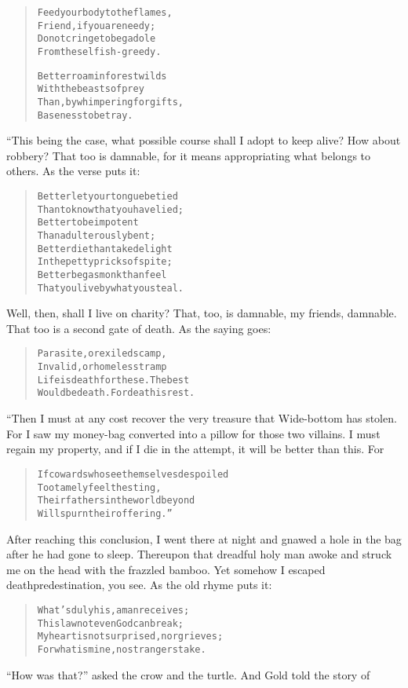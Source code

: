 \documentclass[article, twoside, 14pt]{memoir}
\renewenvironment{verbatim}{%
\begin{quote}%
\vskip -10pt%
\begin{alltt}\normalfont\large}{\end{alltt}%
\end{quote}%
\vskip -10pt
} %
\begin{document}
\begin{verbatim}
Feed your body to the flames,
    Friend, if you are needy;
Do not cringe to beg a dole
    From the selfish-greedy.

Better roam in forest wilds
With the beasts of prey
Than, by whimpering for gifts,
Baseness to betray.
\end{verbatim}
“This being the case, what possible course shall I adopt to keep
alive? How about robbery? That too is damnable, for it means
appropriating what belongs to others. As the verse puts it:

\begin{verbatim}
Better let your tongue be tied
Than to know that you have lied;
Better to be impotent
Than adulterously bent;
Better die than take delight
In the petty pricks of spite;
Better beg as monk than feel
That you live by what you steal.
\end{verbatim}
Well, then, shall I live on charity? That, too, is damnable, my
friends, damnable. That too is a second gate of death. As the
saying goes:

\begin{verbatim}
Parasite, or exiled scamp,
Invalid, or homeless tramp{\textemdash}
Life is death for these. The best
Would be death. For death is rest.
\end{verbatim}
“Then I must at any cost recover the very treasure that Wide-bottom
has stolen. For I saw my money-bag converted into a pillow for
those two villains. I must regain my property, and if I die in the
attempt, it will be better than this. For

\begin{verbatim}
If cowards who see themselves despoiled
    Too tamely feel the sting,
Their fathers in the world beyond
    Will spurn their offering.”
\end{verbatim}
After reaching this conclusion, I went there at night and gnawed a
hole in the bag after he had gone to sleep. Thereupon that dreadful
holy man awoke and struck me on the head with the frazzled bamboo.
Yet somehow I escaped death{\textemdash}predestination, you see. As the old
rhyme puts it:

\begin{verbatim}
What's duly his, a man receives;
    This law not even God can break;
My heart is not surprised, nor grieves;
    For what is mine, no strangers take.
\end{verbatim}
``How was that?'' asked the crow and the turtle. And Gold told the
story of
\end{document}
